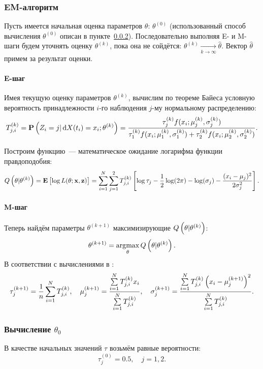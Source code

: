 \documentclass[a4paper,10pt]{article}
\DeclareMathOperator*{\argmax}{\arg\!\max}
\begin{document}
\subsubsection{EM-алгоритм}
Пусть имеется начальная оценка параметров $\theta$: $\theta^{(0)}$ 
(использованный способ вычисления $\theta^{(0)}$ описан 
в пункте~\ref{EM-theta0}).
Последовательно выполняя E- и M-шаги будем уточнять оценку $\theta^{(k)}$,
пока она не сойдётся:
$\theta^{(k)} \xrightarrow[k \rightarrow \infty]{} \widehat{\theta}$.
Вектор $\widehat{\theta}$ примем за результат оценки.

\paragraph*{E-шаг}
Имея текущую оценку параметров $\theta^{(k)}$, вычислим по теореме Байеса 
условную вероятность принадлежности $i$-го наблюдения $j$-му нормальному 
распределению:
$$
T_{j,i}^{(k)} = \mathbf{P}\del{Z_i = j \vert \dif X(t_i) = x_i; \theta^{(k)}} =
  \frac{\tau_j^{(k)} f(x_i; \mu_j^{(k)}, \sigma_j^{(k)})}
       {\tau_1^{(k)} f(x_i; \mu_1^{(k)}, \sigma_1^{(k)}) + 
       {\tau_2^{(k)} f(x_i; \mu_2^{(k)}, \sigma_2^{(k)})}}.
$$

Построим функцию~--- математическое ожидание логарифма функции правдоподобия:
$$
Q\del{\theta \vert \theta^{(k)}} = 
  \mathbf{E}\sbr{\log L(\theta; \mathbf{x}, \mathbf{z})} =
  \sum\limits_{i=1}^{N} \sum\limits_{j=1}^2
    T_{j,i}^{(k)} 
      \sbr{
        \log \tau_j - 
        \frac{1}{2}\log(2\pi) -
        \log(\sigma_j) -
        \frac{(x_i - \mu_j)^2}{2 \sigma_j^2}
      }.
$$

\paragraph*{M-шаг}%
Теперь найдём параметры $\theta^{(k+1)}$ максимизирующие 
$Q\del{\theta \vert \theta^{(k)}}$:
$$
\theta^{(k+1)} = \argmax\limits_{\theta} Q\del{\theta \vert \theta^{(k)}}.
$$
В соответствии с вычислениями в \cite{wiki:em-algorithm}:
$$
\tau_j^{(k+1)} = \frac{1}{n} \sum\limits_{i=1}^{N} T_{j,i}^{(k)},\quad
\mu_j^{(k+1)} = \frac
  {\sum\limits_{i=1}^{N} T_{j,i}^{(k)} x_i}
  {\sum\limits_{i=1}^{N} T_{j,i}^{(k)}},\quad
\sigma_j^{(k+1)} = \frac
  {\sum\limits_{i=1}^{N} T_{j,i}^{(k)} \del{x_i - \mu_j^{(k+1)}}^2}
  {\sum\limits_{i=1}^{N} T_{j,i}^{(k)}}.
$$

\subsubsection{Вычисление $\theta_0$}%
\label{EM-theta0}
В качестве начальных значений $\tau$ возьмём равные вероятности:
$$
\tau_j^{(0)} = 0.5, \quad j = 1, 2.
$$
\end{document}

